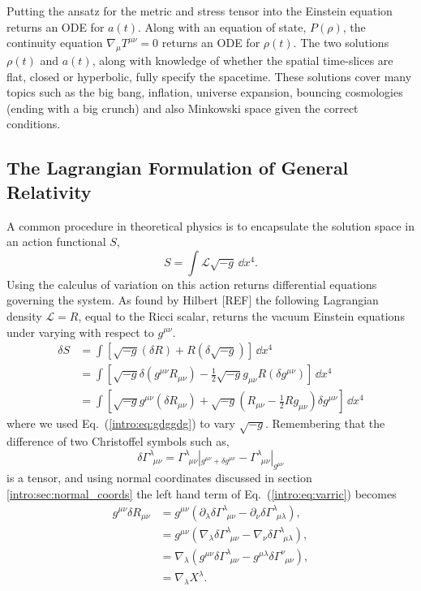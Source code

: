 Putting the ansatz for the metric and stress tensor into the Einstein equation returns an ODE for $a(t)$. Along with an equation of state, $P(\rho)$, the continuity equation $\nabla_\mu T^{\mu\nu}=0$ returns an ODE for $\rho(t)$. The two solutions $\rho(t)$ and $a(t)$, along with knowledge of whether the spatial time-slices are flat, closed or hyperbolic, fully specify the spacetime. These solutions cover many topics such as the big bang, inflation, universe expansion, bouncing cosmologies (ending with a big crunch) and also Minkowski space given the correct conditions. 



\subsection{The Lagrangian Formulation of General Relativity}\label{intro:sec:gr_from_lagrangean}
A common procedure in theoretical physics is to encapsulate the solution space in an action functional $S$,
\begin{equation}
S = \int \mathcal{L} \sqrt{-g} \,\dd x^4.
\end{equation}
Using the calculus of variation on this action returns differential equations governing the system. As found by Hilbert [REF] the following Lagrangian density $\mathcal{L}=R$, equal to the Ricci scalar, returns the vacuum Einstein equations under varying with respect to $g^{\mu\nu}$.
\begin{align}
\delta S &= \int \left[\sqrt{-g} (\delta R) + R (\delta \sqrt{-g})\right]\,\dd x^4 \\
&= \int \left[\sqrt{-g} \delta(g^{\mu\nu}R_{\mu\nu}) -\frac{1}{2} \sqrt{-g} g_{\mu\nu}R (\delta g^{\mu\nu})\right]\,\dd x^4 \\
&= \int \left[\sqrt{-g}g^{\mu\nu}(\delta R_{\mu\nu}) + \sqrt{-g}\left(R_{\mu\nu}-\frac{1}{2}R g_{\mu\nu} \right)\delta g^{\mu\nu}\right]\,\dd x^4 \label{intro:eq:varric}
\end{align}  
where we used Eq.~(\ref{intro:eq:gdggdg}) to vary $\sqrt{-g}$. Remembering that the difference of two Christoffel symbols such as,
\begin{equation}
\delta \Gamma^{\lambda}_{\,\,\,\mu\nu} = \Gamma^{\lambda}_{\,\,\,\mu\nu}|_{g^{\mu\nu}+\delta g^{\mu\nu}} - \Gamma^{\lambda}_{\,\,\,\mu\nu}|_{g^{\mu\nu}}
\end{equation} 
is a tensor, and using normal coordinates discussed in section \ref{intro:sec:normal_coords} the left hand term of Eq.~(\ref{intro:eq:varric}) becomes
\begin{align}
g^{\mu\nu} \delta R_{\mu\nu} &= g^{\mu\nu}\left( \partial_\lambda \delta\Gamma^{\lambda}_{\,\,\,\mu\nu} - \partial_\nu \delta\Gamma^{\lambda}_{\,\,\,\mu\lambda} \right), \\
&= g^{\mu\nu}\left( \nabla_\lambda \delta\Gamma^{\lambda}_{\,\,\,\mu\nu} - \nabla_\nu \delta\Gamma^{\lambda}_{\,\,\,\mu\lambda} \right), \\
&= \nabla_\lambda \left( g^{\mu\nu} \delta\Gamma^{\lambda}_{\,\,\,\mu\nu} - g^{\mu\lambda} \delta\Gamma^{\nu}_{\,\,\,\mu\nu} \right), \\
&=\nabla_\lambda X^\lambda.
\end{align}
